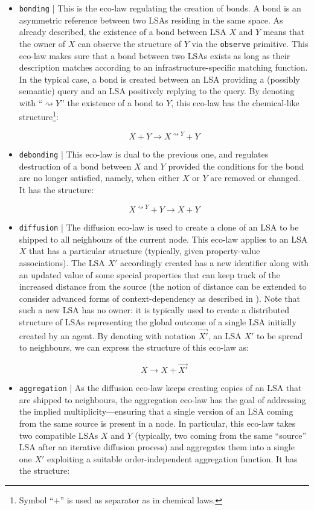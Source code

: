 \documentclass[12pt,a4paper,twoside,openright]{book}
\begin{document}
\begin{itemize}

 \item \texttt{bonding}  | This is the eco-law regulating the creation of bonds. A bond is an asymmetric reference between two LSAs residing in the same space. As already described, the existence of a bond between LSA $X$ and $Y$ means that the owner of $X$ can observe the structure of $Y$ via the \texttt{observe} primitive. This eco-law makes sure that a bond between two LSAs exists as long as their description matches according to an infrastructure-specific matching function. In the typical case, a bond is created between an LSA providing a (possibly semantic) query and an LSA positively replying to the query. By denoting with ``$\rightsquigarrow Y$'' the existence of a bond to $Y$, this eco-law has the chemical-like structure\footnote{Symbol ``$+$'' is used as separator as in chemical laws.}:
 
 \[X + Y \rightarrow X^{\rightsquigarrow Y} + Y\]
 
 \item \texttt{debonding}  | This eco-law is dual to the previous one, and regulates destruction of a bond between $X$ and $Y$ provided the conditions for the bond are no longer satisfied, namely, when either $X$ or $Y$ are removed or changed. It has the structure:
 
 \[X^{\rightsquigarrow Y} + Y \rightarrow X + Y\]
 
 \item \texttt{diffusion} | The diffusion eco-law is used to create a clone of an LSA to be shipped to all neighbours of the current node. This eco-law applies to an LSA $X$ that has a particular structure (typically, given property-value associations). The LSA $X'$ accordingly created has a new identifier along with an updated value of some special properties that can keep track of the increased distance from the source (the notion of distance can be extended to consider advanced forms of context-dependency as described in \cite{SemMatchingSAC2013}). Note that such a new LSA has no owner: it is typically used to create a distributed structure of LSAs representing the global outcome of a single LSA initially created by an agent. By denoting with notation $\overrightarrow{X'}$, an LSA $X'$ to be spread to neighbours, we can express the structure of this eco-law as:
 
 \[X \rightarrow X + \overrightarrow{X'}\]
 
 \item \texttt{aggregation} | As the diffusion eco-law keeps creating copies of an LSA that are shipped to neighbours, the aggregation eco-law has the goal of addressing the implied multiplicity---ensuring that a single version of an LSA coming from the same source is present in a node. In particular, this eco-law takes two compatible LSAs $X$ and $Y$ (typically, two coming from the same ``source'' LSA after an iterative diffusion process) and aggregates them into a single one $X'$ exploiting a suitable order-independent aggregation function. It has the structure:
 

\end{itemize}
\end{document}
